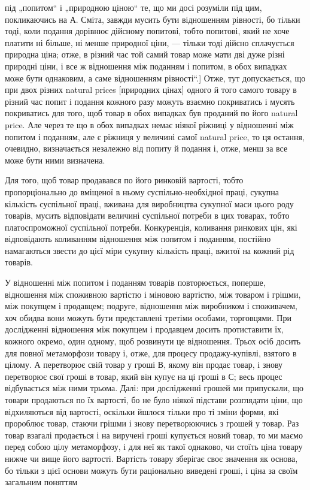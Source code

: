 \parcont{}  %
під „попитом“ і „природною ціною“ те, що ми досі розуміли під
цим, покликаючись на А. Сміта, завжди мусить бути відношенням
рівності, бо тільки тоді, коли подання дорівнює дійсному
попитові, тобто попитові, який не хоче платити ні більше,
ні менше природної ціни, — тільки тоді дійсно сплачується природна
ціна; отже, в різний час той самий товар може мати дві
дуже різні природні ціни, і все ж відношення між поданням
і попитом, в обох випадках може бути однаковим, а саме
відношенням рівності“.] Отже, тут допускається, що при двох
різних natural prices [природних цінах] одного й того самого
товару в різний час попит і подання кожного разу можуть взаємно
покриватись і мусять покриватись для того, щоб товар
в обох випадках був проданий по його natural price. Але через
те що в обох випадках немає ніякої ріжниці у відношенні між
попитом і поданням, але є ріжниця у величині самої natural
price, то ця остання, очевидно, визначається незалежно від попиту
й подання і, отже, менш за все може бути ними визначена.

Для того, щоб товар продавався по його ринковій вартості,
тобто пропорціонально до вміщеної в ньому суспільно-необхідної
праці, сукупна кількість суспільної праці, вживана для
виробництва сукупної маси цього роду товарів, мусить відповідати
величині суспільної потреби в цих товарах, тобто платоспроможної
суспільної потреби. Конкуренція, коливання ринкових
цін, які відповідають коливанням відношення між попитом
і поданням, постійно намагаються звести до цієї міри сукупну
кількість праці, вжитої на кожний рід товарів.

У відношенні між попитом і поданням товарів повторюється,
поперше, відношення між споживною вартістю і міновою вартістю,
між товаром і грішми, між покупцем і продавцем; подруге,
відношення між виробником і споживачем, хоч обидва
вони можуть бути представлені третіми особами, торговцями.
При дослідженні відношення між покупцем і продавцем досить
протиставити їх, кожного окремо, один одному, щоб розвинути
це відношення. Трьох осіб досить для повної метаморфози
товару і, отже, для процесу продажу-купівлі, взятого в цілому.
А перетворює свій товар у гроші В, якому він продає товар,
і знову перетворює свої гроші в товар, який він купує на ці
гроші в С; весь процес відбувається між ними трьома. Далі:
при дослідженні грошей ми припускали, що товари продаються
по їх вартості, бо не було ніякої підстави розглядати ціни, що
відхиляються від вартості, оскільки йшлося тільки про ті зміни
форми, які пророблює товар, стаючи грішми і знову перетворюючись
з грошей у товар. Раз товар взагалі продається і на
виручені гроші купується новий товар, то ми маємо перед
собою цілу метаморфозу, і для неї як такої однаково, чи стоїть
ціна товару нижче чи вище його вартості. Вартість товару зберігає
своє значення як основа, бо тільки з цієї основи можуть бути
раціонально виведені гроші, і ціна за своїм загальним поняттям
\parbreak{}  %
